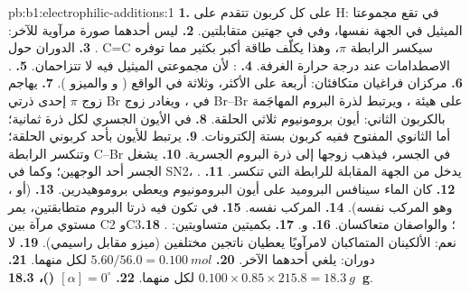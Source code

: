 \begin{solution}{pb:b1:electrophilic-additions:1}
\textbf{1.} على كل كربون تتقدم  على H: في  تقع مجموعتا الميثيل في
الجهة نفسها، وفي  في جهتين متقابلتين.
\textbf{2.}  ليس أحدهما صورة مرآوية للآخر: .
\textbf{3.} الدوران حول C=C سيكسر الرابطة $\pi$، وهذا يكلّف طاقة أكبر
بكثير مما توفره الاصطدامات عند درجة حرارة الغرفة.
\textbf{4.} : لأن مجموعتي الميثيل فيه لا تتزاحمان.
\textbf{5.} .
\textbf{6.} مركزان فراغيان متكافئان: أربعة على الأكثر، وثلاثة في الواقع
( و والميزو ).
\textbf{7.} يهاجم زوج $\pi$ إحدى ذرتي Br في ، ويغادر زوج Br--Br
على هيئة ، ويرتبط  لذرة البروم المهاجَمة بالكربون
الثاني: أيون برومونيوم ثلاثي الحلقة.
\textbf{8.} في الأيون الجسري لكل ذرة ثمانية؛ أما  الثانوي
المفتوح ففيه كربون بستة إلكترونات.
\textbf{9.} يرتبط  للأيون  بأحد كربوني الحلقة؛ وتنكسر الرابطة C--Br
في الجسر، فيذهب زوجها إلى ذرة البروم الجسرية.
\textbf{10.} يشغل الجسر أحد الوجهين؛ وكما في SN2، يدخل 
من الجهة المقابلة للرابطة التي تنكسر.
\textbf{11.} .
\textbf{12.} كان الماء سينافس البروميد على أيون البرومونيوم ويعطي
بروموهيدرين.
\textbf{13.}  (أو ، وهو المركب نفسه).
\textbf{14.} المركب نفسه.
\textbf{15.} في  تكون فيه ذرتا البروم متطابقتين، يمر مستوي مرآة
بين C2 وC3؛ والواصفان متعاكسان.
\textbf{16.}  و.
\textbf{17.} بكميتين متساويتين: .
\textbf{18.} نعم: الألكينان المتماكبان لامرآويًا يعطيان ناتجين مختلفين
(ميزو مقابل راسيمي).
\textbf{19.} لا دوران: يلغي  أحدهما الآخر.
\textbf{20.} $5.60/56.0 = \qty{0.100}{mol}$ لكل منهما.
\textbf{21.} $0.100 \times 0.85 \times 215.8 = \qty{18.3}{g}$ لكل منهما.
\textbf{22.} \textbf{$[\alpha] = 0^\circ$ ()، \qty{18.3}{g}}.
\end{solution}
